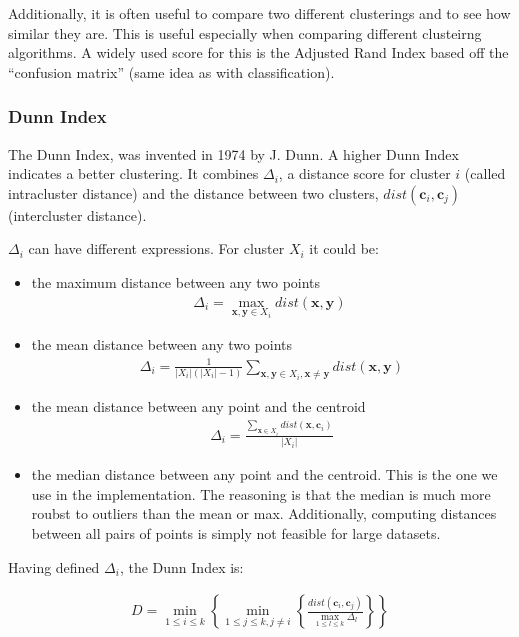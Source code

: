 \documentclass{article}
\begin{document}
Additionally, it is often useful to compare two different clusterings and to
see how similar they are. This is useful especially when comparing different
clusteirng algorithms. A widely used score for this is the Adjusted Rand Index
based off the ``confusion matrix'' (same idea as with classification).

\subsubsection{Dunn Index}
The Dunn Index, was invented in 1974 by J. Dunn. A higher Dunn Index indicates
a better clustering. It combines $\Delta_i$, a distance score for cluster $i$
(called intracluster distance) and the distance between two clusters,
$dist(\mathbf{c}_i, \mathbf{c}_j)$ (intercluster distance).

$\Delta_i$ can have different expressions. For cluster $X_i$ it could be:
\begin{itemize}
    \item the maximum distance between any two points
        \begin{eqnarray}
            \Delta_i = \max_{\mathbf{x}, \mathbf{y} \in X_i} dist(\mathbf{x},
            \mathbf{y}) \;\textrm{}
        \end{eqnarray}
    \item the mean distance between any two points
        \begin{eqnarray}
            \Delta_i = \frac{1}{|X_i| (|X_i| - 1)} \sum_{\mathbf{x}, \mathbf{y} \in
            X_i, \mathbf{x} \ne \mathbf{y}} dist(\mathbf{x}, \mathbf{y})
        \end{eqnarray}
    \item the mean distance between any point and the centroid
        \begin{eqnarray}
            \Delta_i = \frac{\sum_{\mathbf{x} \in X_i} dist(\mathbf{x},
            \mathbf{c}_i)}{|X_i|}
        \end{eqnarray}
    \item the median distance between any point and the centroid. This is the
        one we use in the implementation. The reasoning is that the median is
        much more roubst to outliers than the mean or max. Additionally,
        computing distances between all pairs of points is simply not feasible
        for large datasets.
\end{itemize}

Having defined $\Delta_i$, the Dunn Index is:

\begin{eqnarray}
    D = \min_{1 \le i \le k} \left\{ \min_{1 \le j \le k, j \ne i} \left\{
        \frac{dist(\mathbf{c}_i, \mathbf{c}_j)}{\max_{1 \le l \le k} \Delta_l}
    \right\} \right\}
\end{eqnarray}
\end{document}
